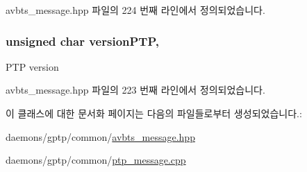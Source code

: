 avbts\+\_\+message.\+hpp 파일의 224 번째 라인에서 정의되었습니다.

\subsubsection[{\texorpdfstring{version\+P\+TP}{versionPTP}}]{\setlength{\rightskip}{0pt plus 5cm}unsigned char version\+P\+TP\hspace{0.3cm}{\ttfamily [protected]}, {\ttfamily [inherited]}}\hypertarget{class_p_t_p_message_common_aebd1e0693c6170ff1b08b2471db92a80}{}\label{class_p_t_p_message_common_aebd1e0693c6170ff1b08b2471db92a80}
P\+TP version 

avbts\+\_\+message.\+hpp 파일의 223 번째 라인에서 정의되었습니다.



이 클래스에 대한 문서화 페이지는 다음의 파일들로부터 생성되었습니다.\+:\begin{DoxyCompactItemize}
\item 
daemons/gptp/common/\hyperlink{avbts__message_8hpp}{avbts\+\_\+message.\+hpp}\item 
daemons/gptp/common/\hyperlink{ptp__message_8cpp}{ptp\+\_\+message.\+cpp}\end{DoxyCompactItemize}
